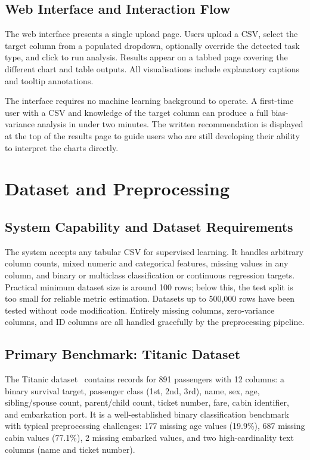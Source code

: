 \documentclass[conference]{IEEEtran}
\begin{document}
\subsection{Web Interface and Interaction Flow}

The web interface presents a single upload page. Users upload a CSV, select the target column from a populated dropdown, optionally override the detected task type, and click to run analysis. Results appear on a tabbed page covering the different chart and table outputs. All visualisations include explanatory captions and tooltip annotations.

The interface requires no machine learning background to operate. A first-time user with a CSV and knowledge of the target column can produce a full bias-variance analysis in under two minutes. The written recommendation is displayed at the top of the results page to guide users who are still developing their ability to interpret the charts directly.

\section{Dataset and Preprocessing}

\subsection{System Capability and Dataset Requirements}

The system accepts any tabular CSV for supervised learning. It handles arbitrary column counts, mixed numeric and categorical features, missing values in any column, and binary or multiclass classification or continuous regression targets. Practical minimum dataset size is around 100 rows; below this, the test split is too small for reliable metric estimation. Datasets up to 500,000 rows have been tested without code modification. Entirely missing columns, zero-variance columns, and ID columns are all handled gracefully by the preprocessing pipeline.

\subsection{Primary Benchmark: Titanic Dataset}

The Titanic dataset~\cite{b6, b7, b8} contains records for 891 passengers with 12 columns: a binary survival target, passenger class (1st, 2nd, 3rd), name, sex, age, sibling/spouse count, parent/child count, ticket number, fare, cabin identifier, and embarkation port. It is a well-established binary classification benchmark with typical preprocessing challenges: 177 missing age values (19.9\%), 687 missing cabin values (77.1\%), 2 missing embarked values, and two high-cardinality text columns (name and ticket number).
\end{document}
